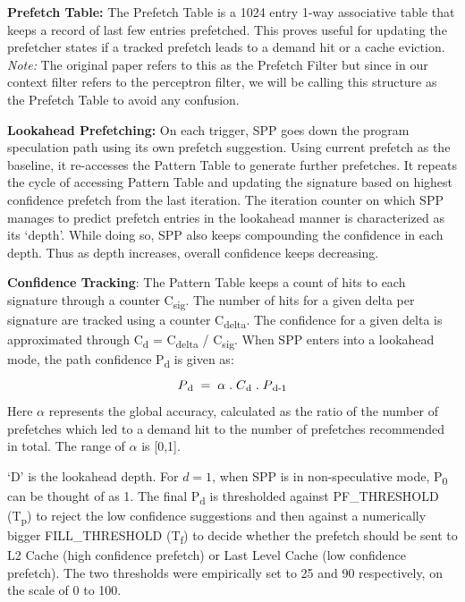 \textbf{Prefetch Table:} The Prefetch Table is a 1024 entry 1-way associative table that
keeps a record of last few entries prefetched.  This proves useful for
updating the prefetcher states if a tracked prefetch leads to a demand hit or
a cache eviction. \textit{Note:} The original paper refers to this as the Prefetch Filter 
but since in our context filter refers to the perceptron filter, we will be calling 
this structure as the Prefetch Table to avoid any confusion.

\textbf{Lookahead Prefetching:} On each trigger, SPP goes down
the program speculation path using its own prefetch suggestion.
Using current prefetch as the baseline, it re-accesses the Pattern Table to generate further
prefetches. It repeats the cycle of accessing Pattern Table and
updating the signature based on highest confidence prefetch from the
last iteration.  The iteration counter on which SPP manages to
predict prefetch entries in the lookahead manner is characterized as
its `depth'.  While doing so, SPP also keeps compounding the
confidence in each depth.  Thus as depth increases, overall confidence
keeps decreasing.  

\textbf{Confidence Tracking}: The Pattern Table keeps a count of hits to each
signature through a counter C\textsubscript{sig}.  The number of hits
for a given delta per signature are tracked using a counter
C\textsubscript{delta}.  The confidence for a given delta is
approximated through C\textsubscript{d} = C\textsubscript{delta} /
C\textsubscript{sig}.  When SPP enters into a lookahead mode, the path
confidence P\textsubscript{d} is given as:
$$P\textsubscript{d} \;=\; \alpha  \;.\;  C\textsubscript{d}  \;.\;  P\textsubscript{d-1}$$ 
Here $\alpha$ represents the global accuracy, calculated as the ratio of 
the number of prefetches which led to a demand hit to the number of 
prefetches recommended in total. The range of $\alpha$ is [0,1].

`D' is the lookahead depth. For $d = 1$, when SPP is in
non-speculative mode, P\textsubscript{0} can be thought of as 1. 
The final P\textsubscript{d} is thresholded against PF\_THRESHOLD 
(T\textsubscript{p}) to reject the low confidence suggestions and 
then against a numerically bigger FILL\_THRESHOLD (T\textsubscript{f}) to 
decide whether the prefetch should be sent to L2 Cache 
(high confidence prefetch) or Last Level Cache (low confidence prefetch).
The two thresholds were empirically set to 25 and 90 respectively, 
on the scale of 0 to 100.  



